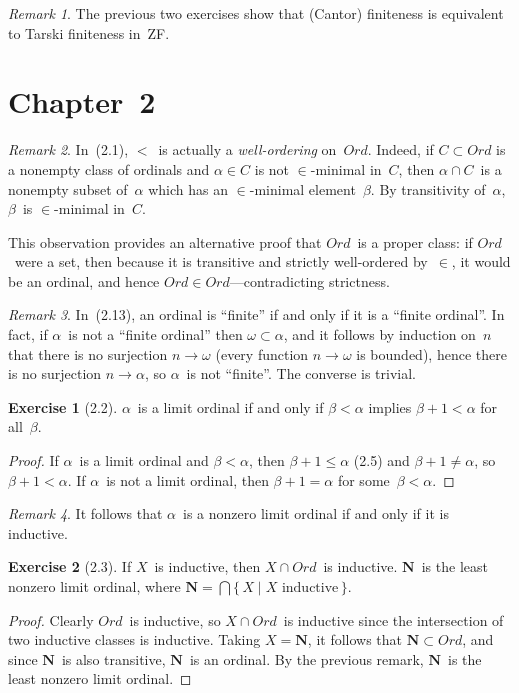 \documentclass[letterpaper,12pt]{article}
\newcommand{\N}{\boldsymbol{N}}
\newcommand{\Ord}{\mathit{Ord}}
\newcommand{\sect}{\cap}
\newcommand{\bigsect}{\bigcap}
\theoremstyle{definition}
\newtheorem*{exer}{Exercise}
\theoremstyle{remark}
\newtheorem*{rmk}{Remark}
\begin{document}
\begin{rmk}
The previous two exercises show that (Cantor) finiteness is equivalent to Tarski finiteness in~ZF.
\end{rmk}

\section*{Chapter~2}
\begin{rmk}
In~(2.1), \(<\)~is actually a \emph{well-ordering} on~\(\Ord\). Indeed, if \(C\subset\Ord\) is a nonempty class of ordinals and \(\alpha\in C\) is not \(\in\)-minimal in~\(C\), then \(\alpha\sect C\)~is a nonempty subset of~\(\alpha\) which has an \(\in\)-minimal element~\(\beta\). By transitivity of~\(\alpha\), \(\beta\)~is \(\in\)-minimal in~\(C\).

This observation provides an alternative proof that \(\Ord\)~is a proper class: if \(\Ord\)~were a set, then because it is transitive and strictly well-ordered by~\(\in\), it would be an ordinal, and hence \(\Ord\in\Ord\)---contradicting strictness.
\end{rmk}

\begin{rmk}
In~(2.13), an ordinal is ``finite'' if and only if it is a ``finite ordinal''. In fact, if \(\alpha\)~is not a ``finite ordinal'' then \(\omega\subset\alpha\), and it follows by induction on~\(n\) that there is no surjection \(n\to\omega\) (every function \(n\to\omega\) is bounded), hence there is no surjection \(n\to\alpha\), so \(\alpha\)~is not ``finite''. The converse is trivial.
\end{rmk}

\begin{exer}[2.2]
\(\alpha\)~is a limit ordinal if and only if \(\beta<\alpha\) implies \(\beta+1<\alpha\) for all~\(\beta\).
\end{exer}
\begin{proof}
If \(\alpha\)~is a limit ordinal and \(\beta<\alpha\), then \(\beta+1\le\alpha\) (2.5) and \(\beta+1\ne\alpha\), so \(\beta+1<\alpha\). If \(\alpha\)~is not a limit ordinal, then \(\beta+1=\alpha\) for some~\(\beta<\alpha\).
\end{proof}
\begin{rmk}
It follows that \(\alpha\)~is a nonzero limit ordinal if and only if it is inductive.
\end{rmk}

\begin{exer}[2.3]
If \(X\)~is inductive, then \(X\sect\Ord\)~is inductive. \(\N\)~is the least nonzero limit ordinal, where \(\N=\bigsect\{\,X\mid X\text{ inductive}\,\}\).
\end{exer}
\begin{proof}
Clearly \(\Ord\)~is inductive, so \(X\sect\Ord\)~is inductive since the intersection of two inductive classes is inductive. Taking \(X=\N\), it follows that \(\N\subset\Ord\), and since \(\N\)~is also transitive, \(\N\)~is an ordinal. By the previous remark, \(\N\)~is the least nonzero limit ordinal.
\end{proof}
\end{document}
